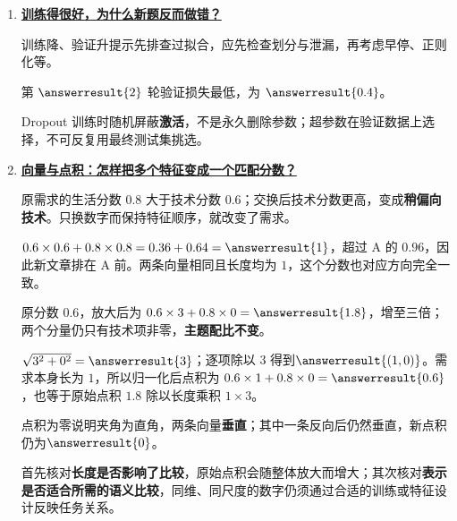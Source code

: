 \begin{enumerate}[leftmargin=5.4em,labelsep=.7em,itemsep=9pt]
\par{}
\item[\textbf{第 5 章}] \label{answer:18-generalization}\textbf{\hyperref[check:18-generalization]{训练得很好，为什么新题反而做错？}}\par\nobreak
{}训练降、验证升提示先排查过拟合，应先检查划分与泄漏，再考虑早停、正则化等。
\par{}第 $\answerresult{2}$ 轮验证损失最低，为 $\answerresult{0.4}$。
\par{}Dropout 训练时随机屏蔽\textbf{激活}，不是永久删除参数；超参数在验证数据上选择，不可反复用最终测试集挑选。
\par{}
\item[\textbf{第 6 章}] \label{answer:01-vectors}\textbf{\hyperref[check:01-vectors]{向量与点积：怎样把多个特征变成一个匹配分数？}}\par\nobreak
{}原需求的生活分数 $0.8$ 大于技术分数 $0.6$；交换后技术分数更高，变成\textbf{稍偏向技术}。只换数字而保持特征顺序，就改变了需求。
\par{}$0.6\times0.6+0.8\times0.8=0.36+0.64=\answerresult{1}$，超过 A 的 $0.96$，因此新文章排在 A 前。两条向量相同且长度均为 $1$，这个分数也对应方向完全一致。
\par{}原分数 $0.6$，放大后为 $0.6\times3+0.8\times0=\answerresult{1.8}$，增至三倍；两个分量仍只有技术项非零，\textbf{主题配比不变}。
\par{}$\sqrt{3^2+0^2}=\answerresult{3}$；逐项除以 $3$ 得到$\answerresult{(1,0)}$。需求本身长为 $1$，所以归一化后点积为 $0.6\times1+0.8\times0=\answerresult{0.6}$，也等于原始点积 $1.8$ 除以长度乘积 $1\times3$。
\par{}点积为零说明夹角为直角，两条向量\textbf{垂直}；其中一条反向后仍然垂直，新点积仍为$\answerresult{0}$。
\par{}首先核对\textbf{长度是否影响了比较}，原始点积会随整体放大而增大；其次核对\textbf{表示是否适合所需的语义比较}，同维、同尺度的数字仍须通过合适的训练或特征设计反映任务关系。
\par{}

\end{enumerate}
